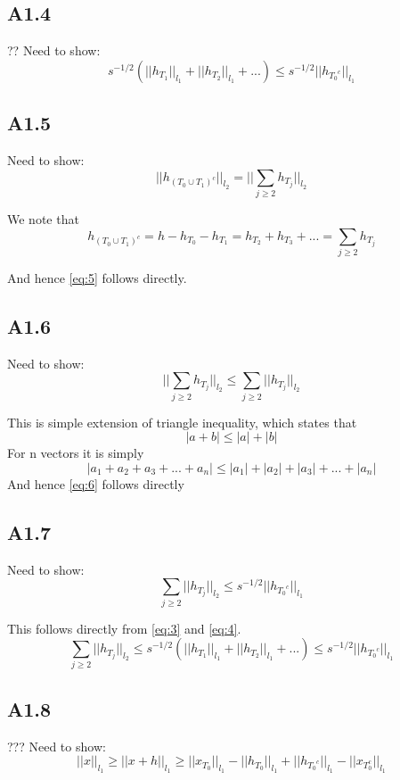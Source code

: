 \documentclass{article}
\newcommand{\lone}[1]{
  ||#1||_{l_1}
}
\newcommand{\ltwo}[1]{
  ||#1||_{l_2}
}
\newcommand{\htj}[1]{
  h_{T_{#1}}
}
\newcommand{\htc}[1]{
  h_{{#1}^c}
}
\newcommand{\hto}[1]{
  h_{#1}
}
\begin{document}
\subsection*{A1.4}
??
Need to show:
\begin{equation}
  \label{eq:4}
  s^{-1/2}(\lone{\htj{1}} + \lone{\htj{2}} + ...) \le s^{-1/2}\lone{\htc{T_0}}
\end{equation}

\subsection*{A1.5}
Need to show:
\begin{equation}
  \label{eq:5}
  \ltwo{\htc{(T_0 \cup T_1)}} = \ltwo{\sum_{j \ge 2}\htj{j}}
\end{equation}

We note that $$\htc{(T_0 \cup T_1)} = h - \hto{T_0} - \hto{T_1} = \hto{T_2} + \hto{T_3} + ... = \sum_{j \ge 2} \hto{T_j}$$

And hence \ref{eq:5} follows directly.

\subsection*{A1.6}
Need to show:
\begin{equation}
  \label{eq:6}
  \ltwo{\sum_{j \ge 2}{\htj{j}}} \le \sum_{j \ge 2} \ltwo{\htj{j}}
\end{equation}

This is simple extension of triangle inequality, which states that
$$|a+b| \le |a| + |b|$$
For n vectors it is simply
$$|a_1 + a_2 + a_3 +... +a_n| \le |a_1| + |a_2| + |a_3| + ... + |a_n| $$
And hence \ref{eq:6} follows directly

\subsection*{A1.7}
Need to show:
\begin{equation}
  \label{eq:7}
  \sum_{j \ge 2} \ltwo{\htj{j}} \le s^{-1/2}\lone{\htc{T_0}}
\end{equation}

This follows directly from \ref{eq:3} and \ref{eq:4}.
$$\sum_{j \ge 2} \ltwo{\htj{j}} \le s^{-1/2}(\lone{\htj{1}} + \lone{\htj{2}} + ...) \le s^{-1/2}\lone{\htc{T_0}}$$
\subsection*{A1.8}
???
Need to show:
\begin{equation}
  \label{eq:8}
  \lone{x} \ge \lone{x+h} \ge \lone{x_{T_0}} - \lone{\hto{T_0}} + \lone{\htc{T_0}} - \lone{x_{T_0^c}}
\end{equation}
\end{document}
